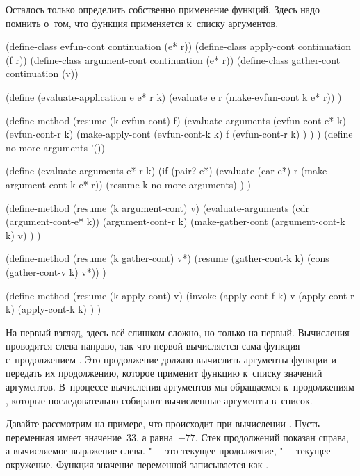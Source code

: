 Осталось только определить собственно применение функций. Здесь надо помнить
о~том, что функция применяется к~списку аргументов.

\begin{code:lisp}
(define-class evfun-cont    continuation (e* r))
(define-class apply-cont    continuation (f  r))
(define-class argument-cont continuation (e* r))
(define-class gather-cont   continuation (v))

(define (evaluate-application e e* r k)
  (evaluate e r (make-evfun-cont k e* r)) )

(define-method (resume (k evfun-cont) f)
  (evaluate-arguments (evfun-cont-e* k)
                      (evfun-cont-r k)
                      (make-apply-cont (evfun-cont-k k) f
                                       (evfun-cont-r k) ) ) )
(define no-more-arguments '())

(define (evaluate-arguments e* r k)
  (if (pair? e*)
      (evaluate (car e*) r (make-argument-cont k e* r))
      (resume k no-more-arguments) ) )

(define-method (resume (k argument-cont) v)
  (evaluate-arguments (cdr (argument-cont-e* k))
                      (argument-cont-r k)
                      (make-gather-cont (argument-cont-k k) v) ) )

(define-method (resume (k gather-cont) v*)
  (resume (gather-cont-k k) (cons (gather-cont-v k) v*)) )

(define-method (resume (k apply-cont) v)
  (invoke (apply-cont-f k) v
          (apply-cont-r k)
          (apply-cont-k k) ) )
\end{code:lisp}

На первый взгляд, здесь всё слишком сложно, но только на первый. Вычисления
проводятся слева направо, так что первой вычисляется сама функция с~продолжением
. Это продолжение должно вычислить аргументы функции и передать
их продолжению, которое применит функцию к~списку значений аргументов.
В~процессе вычисления аргументов мы обращаемся к~продолжениям ,
которые последовательно собирают вычисленные аргументы в~список.

Давайте рассмотрим на примере, что происходит при вычислении . Пусть переменная  имеет значение~$33$, а 
равна~$-77$. Стек продолжений показан справа, а вычисляемое выражение слева.
 "--- это текущее продолжение,  "--- текущее окружение.
Функция-значение переменной  записывается как .

